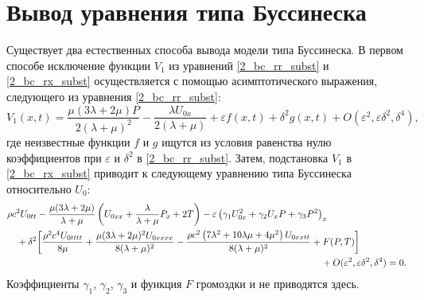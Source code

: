 \documentclass[12pt, a4paper]{article}
\begin{document}
\section{Вывод уравнения типа Буссинеска}
Существует два естественных способа вывода модели типа Буссинеска. В первом способе исключение функции $V_1$ из уравнений \eqref{2_bc_rr_subst} и \eqref{2_bc_rx_subst} осуществляется с помощью асимптотического выражения, следующего из уравнения \eqref{2_bc_rr_subst}:
\begin{equation} \label{v1_asympt}
V_1(x, t) = \frac{\mu(3\lambda + 2\mu) P}{2(\lambda + \mu)^2} - \frac{\lambda U_{0x}}{2(\lambda + \mu)} + \varepsilon f(x,t) + \delta^2 g(x,t) + O(\varepsilon^2, \varepsilon\delta^2, \delta^4),
\end{equation}
где неизвестные функции $f$ и $g$ ищутся из условия равенства нулю коэффициентов при $\varepsilon$ и $\delta^2$ в \eqref{2_bc_rr_subst}. Затем, подстановка $V_1$ в \eqref{2_bc_rx_subst} приводит к следующему уравнению типа Буссинеска относительно $U_0$:
\begin{equation} \label{eq_u0_asympt}
\begin{split}
&\rho c^2 U_{0tt} - \frac{\mu(3\lambda + 2\mu)}{\lambda + \mu}\left(U_{0xx} + \frac{\lambda}{\lambda + \mu} P_x + 2T\right) - \varepsilon \left(\gamma_1 U_{0x}^2 + \gamma_2 U_x P + \gamma_3 P^2 \right)_x \\
&\quad+ \delta^2 \bigg[\frac{\rho ^2 c^4 U_{0tttt}}{8\mu} + \frac{\mu (3\lambda + 2\mu)^2 U_{0xxxx}}{8(\lambda + \mu)^2} - \frac{\rho c^2 \left(7\lambda^2 + 10\lambda\mu + 4\mu^2\right) U_{0xxtt}}{8(\lambda + \mu)^2} + F(P, T) \bigg]\\
&\hspace{117mm}+ O(\varepsilon^2, \varepsilon\delta^2, \delta^4) = 0.
\end{split}
\end{equation}
Коэффициенты $\gamma_1$, $\gamma_2$, $\gamma_3$ и функция $F$ громоздки и не приводятся здесь.
\end{document}
